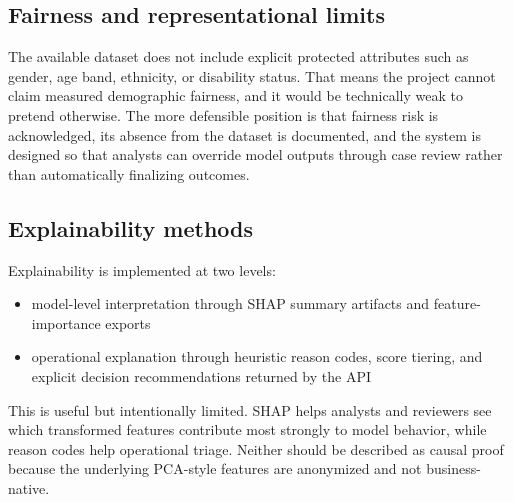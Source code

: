 \documentclass[11pt]{article}
\begin{document}
\subsection*{Fairness and representational limits}
The available dataset does not include explicit protected attributes such as gender, age band, ethnicity, or disability status. That means the project cannot claim measured demographic fairness, and it would be technically weak to pretend otherwise. The more defensible position is that fairness risk is acknowledged, its absence from the dataset is documented, and the system is designed so that analysts can override model outputs through case review rather than automatically finalizing outcomes.

\subsection*{Explainability methods}
Explainability is implemented at two levels:
\begin{itemize}
  \item model-level interpretation through SHAP summary artifacts and feature-importance exports
  \item operational explanation through heuristic reason codes, score tiering, and explicit decision recommendations returned by the API
\end{itemize}

This is useful but intentionally limited. SHAP helps analysts and reviewers see which transformed features contribute most strongly to model behavior, while reason codes help operational triage. Neither should be described as causal proof because the underlying PCA-style features are anonymized and not business-native.
\end{document}
